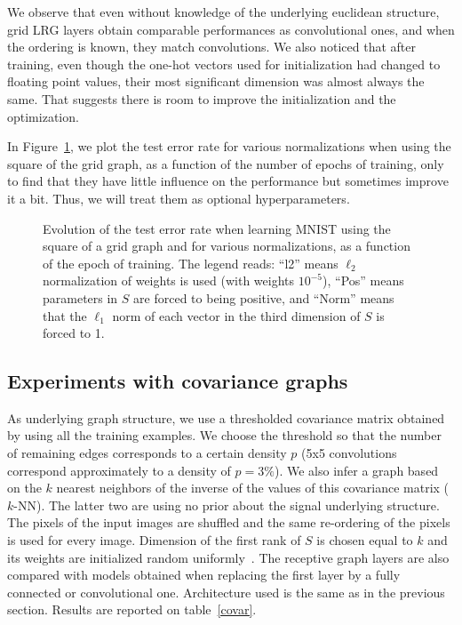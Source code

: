 We observe that even without knowledge of the underlying euclidean structure, grid LRG layers obtain comparable performances as convolutional ones, and when the ordering is known, they match convolutions. We also noticed that after training, even though the one-hot vectors used for initialization had changed to floating point values, their most significant dimension was almost always the same. That suggests there is room to improve the initialization and the optimization.

In Figure~\ref{functionofepoch}, we plot the test error rate for various normalizations when using the square of the grid graph, as a function of the number of epochs of training, only to find that they have little influence on the performance but sometimes improve it a bit. Thus, we will treat them as optional hyperparameters.

\begin{figure}[H]
  \begin{center}
    
  \end{center}
  \caption{Evolution of the test error rate when learning MNIST using the square of a grid graph and for various normalizations, as a function of the epoch of training. The legend reads: ``l2'' means $\ell_2$ normalization of weights is used (with weights $10^{-5}$), ``Pos'' means parameters in $S$ are forced to being positive, and ``Norm'' means that the $\ell_1$ norm of each vector in the third dimension of $S$ is forced to 1.}
  \label{functionofepoch}
\end{figure}

\subsection{Experiments with covariance graphs}

As underlying graph structure, we use a thresholded covariance matrix obtained by using all the training examples. We choose the threshold so that the number of remaining edges corresponds to a certain density $p$ (5x5 convolutions correspond approximately to a density of $p=3\%$). We also infer a graph based on the $k$ nearest neighbors of the inverse of the values of this covariance matrix ($k$-NN). The latter two are using no prior about the signal underlying structure. The pixels of the input images are shuffled and the same re-ordering of the pixels is used for every image. Dimension of the first rank of $S$ is chosen equal to $k$ and its weights are initialized random uniformly~\cite{glorot2010understanding}.
The receptive graph layers are also compared with models obtained when replacing the first layer by a fully connected or convolutional one. Architecture used is the same as in the previous section. Results are reported on table~\ref{covar}.

